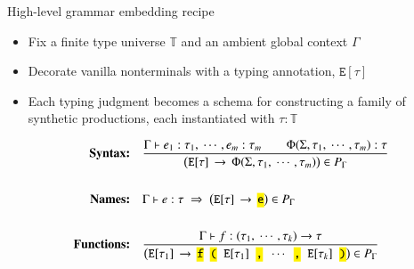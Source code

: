 \documentclass{beamer}
\newcommand{\codett}[1]{\texttt{\hl{#1}}}
\newcommand{\nt}[1]{\texttt{#1}}      %
\newcommand{\tok}[1]{\codett{#1}}     %
\newcommand{\gap}{\;\;}
\begin{document}
\begin{frame}{High-level grammar embedding recipe}

  \begin{itemize}\setlength\itemsep{0.35em}
  \item Fix a finite type universe $\mathbb{T}$ and an ambient global context $\Gamma$
  \item Decorate vanilla nonterminals with a typing annotation, $\nt{E}[\tau]$
  \item Each typing judgment becomes a schema for constructing a family of synthetic productions, each instantiated with $\tau : \mathbb{T}$
  \end{itemize}
  \vspace{0.2cm}
  \begin{align*}
    \textbf{Syntax:}&\quad
    \frac{\Gamma \vdash e_1:\tau_1,\ \cdots, e_m:\tau_m \qquad \Phi(\Sigma, \tau_1,\ \cdots,\tau_m):\tau}{\big(\nt{E}[\tau]\,\rightarrow\, \Phi(\Sigma, \tau_1,\ \cdots,\tau_m)\big)\in P_\Gamma}\\\\
    \textbf{Names:}&\quad
    \Gamma \vdash e:\tau \;\Rightarrow\; \big(\nt{E}[\tau]\,\rightarrow\,\tok{e}\big)\in P_\Gamma\\\\
    \textbf{Functions:}&\quad
    \frac{\Gamma \vdash f:(\tau_1,\ \cdots, \tau_k) \rightarrow \tau}{\big(\nt{E}[\tau_1]\,\rightarrow\,\tok{f}\gap\tok{(}\gap\nt{E}[\tau_1]\gap\tok{,}\gap \cdots\gap\tok{,}\gap\nt{E}[\tau_k]\gap\tok{)} \big)\in P_\Gamma}
  \end{align*}
  \begin{itemize}\setlength\itemsep{0.25em}
  \end{itemize}
\end{frame}
\end{document}
